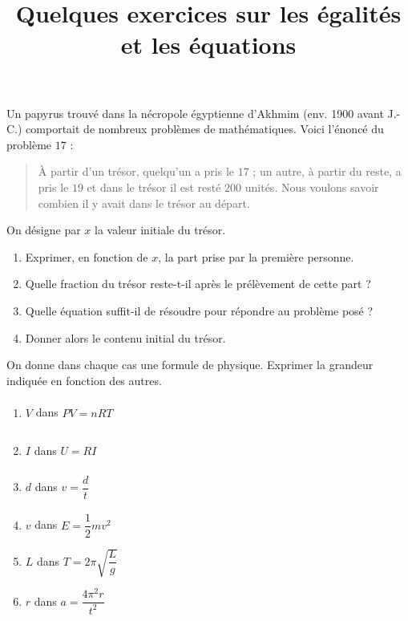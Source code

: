 \documentclass[a4paper]{article}
\begin{document}
\title{Quelques exercices sur les égalités et les équations}

\pagestyle{empty}

\date{}
\author{}
\maketitle{}
\thispagestyle{empty}

\exo Un papyrus trouvé dans la nécropole égyptienne d'Akhmim (env. 1900 avant J.-C.) comportait de nombreux problèmes de mathématiques. Voici l'énoncé du problème \no $17$ :

\smallskip

\begin{quotation}
  À partir d'un trésor, quelqu'un a pris le $17$\ieme{} ; un autre, à partir du reste, a pris le $19$\ieme{} et dans le trésor il est resté $200$ unités. Nous voulons savoir combien il y avait dans le trésor au départ.
\end{quotation}

On désigne par $x$ la valeur initiale du trésor.

\begin{enumerate}
  \item Exprimer, en fonction de $x$, la part prise par la première personne.
  \item Quelle fraction du trésor reste-t-il après le prélèvement de cette part ?
  \item Quelle équation suffit-il de résoudre pour répondre au problème posé ?
  \item Donner alors le contenu initial du trésor.
\end{enumerate}

\bigskip

\exo On donne dans chaque cas une formule de physique. Exprimer la grandeur indiquée en fonction des autres.
\begin{multicols}{3}
  \begin{enumerate}
    \item $V$ dans $PV=nRT\phantom{\sqrt{\dfrac{1}{2}}}$
    \item $I$ dans $U=RI\phantom{\dfrac{1}{2}}$\columnbreak{}
    \item $d$ dans $v=\dfrac{d}{t}\phantom{\sqrt{\dfrac{1}{2}}}$
    \item $v$ dans $E=\dfrac{1}{2}mv^{2}$
    \item $L$ dans $T=2\pi\sqrt{\dfrac{L}{g}}$
    \item $r$ dans $a=\dfrac{4\pi^{2}r}{t^{2}}$
  \end{enumerate}
\end{multicols}
\end{document}
